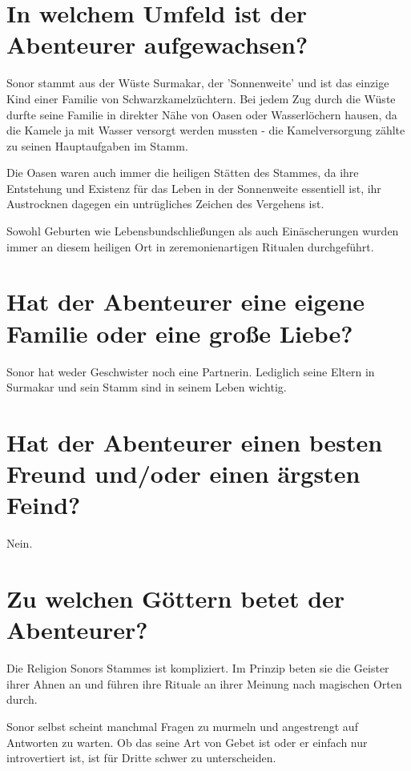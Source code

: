 \documentclass{article}
\begin{document}
	\section[Soziales Umfeld]{In welchem Umfeld ist der Abenteurer aufgewachsen?}
	
	Sonor stammt aus der Wüste Surmakar, der 'Sonnenweite' und ist das
	einzige Kind einer Familie von Schwarzkamelzüchtern. Bei jedem Zug durch
	die Wüste durfte seine Familie in direkter Nähe von Oasen oder
	Wasserlöchern hausen, da die Kamele ja mit Wasser versorgt werden
	mussten - die Kamelversorgung zählte zu seinen Hauptaufgaben im Stamm.

	Die Oasen waren auch immer die heiligen Stätten des Stammes, da ihre
	Entstehung und Existenz für das Leben in der Sonnenweite essentiell ist,
	ihr Austrocknen dagegen ein untrügliches Zeichen des Vergehens ist.
	
	Sowohl Geburten wie Lebensbundschließungen als auch Einäscherungen wurden immer
	an diesem heiligen Ort in zeremonienartigen Ritualen durchgeführt.


	\section[Beziehungsstatus]{Hat der Abenteurer eine eigene Familie oder eine große Liebe?}

	Sonor hat weder Geschwister noch eine Partnerin. Lediglich seine Eltern
	in Surmakar und sein Stamm sind in seinem Leben wichtig.


	\section[Freund und Feind]{Hat der Abenteurer einen besten Freund und/oder einen ärgsten Feind?}

	Nein.


	\section[Religion]{Zu welchen Göttern betet der Abenteurer?}
	
	Die Religion Sonors Stammes ist kompliziert. Im Prinzip beten sie die
	Geister ihrer Ahnen an und führen ihre Rituale an ihrer Meinung nach magischen
	Orten durch.

	Sonor selbst scheint manchmal Fragen zu murmeln und angestrengt auf
	Antworten zu warten. Ob das seine Art von Gebet ist oder er einfach nur
	introvertiert ist, ist für Dritte schwer zu unterscheiden.
\end{document}
